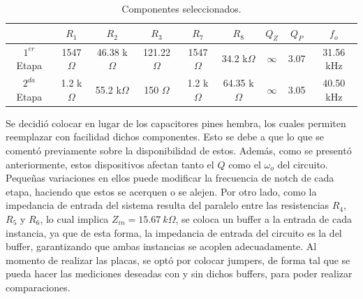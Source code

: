 \begin{table}[H]
\centering
\begin{tabular}{ccccccccc}
\hline 
 & $R_1$ & $R_2$ & $R_3$ & $R_7$ & $R_8$ & $Q_Z$ & $Q_P$ & $f_o$ \\
 \hline
$1^{er}$ Etapa & 1547 $\Omega$ & 46.38 k$\Omega$ & 121.22 $\Omega$ & 1547 $\Omega$ & 34.2 k$\Omega$ & $\infty$ & 3.07 & 31.56 kHz \\
$2^{da}$ Etapa & 1.2 k$\Omega$ & 55.2 k$\Omega$ & 150 $\Omega$ & 1.2 k$\Omega$ & 64.35 k$\Omega$ & $\infty$ & 3.05 & 40.50 kHz \\
\hline
\end{tabular}
\caption{Componentes seleccionados.}
\label{tab:componentes}
\end{table} 

Se decidió colocar en lugar de los capacitores pines hembra, los cuales permiten reemplazar con facilidad dichos componentes. Esto se debe a que lo que se comentó previamente sobre la disponibilidad de estos. Además, como se presentó anteriormente, estos dispositivos afectan tanto el $Q$ como el $\omega_o$ del circuito. Pequeñas variaciones en ellos puede modificar la frecuencia de notch de cada etapa, haciendo que estos se acerquen o se alejen. Por otro lado, como la impedancia de entrada del sistema resulta del paralelo entre las resistencias $R_4$, $R_5$ y $R_6$, lo cual implica $Z_{in} = 15.67 \ k\Omega$, se coloca un buffer a la entrada de cada instancia, ya que de esta forma, la impedancia de entrada del circuito es la del buffer, garantizando que ambas instancias se acoplen adecuadamente. 
Al momento de realizar las placas, se optó por colocar jumpers, de forma tal que se pueda hacer las mediciones deseadas con y sin dichos buffers, para poder realizar comparaciones.   

